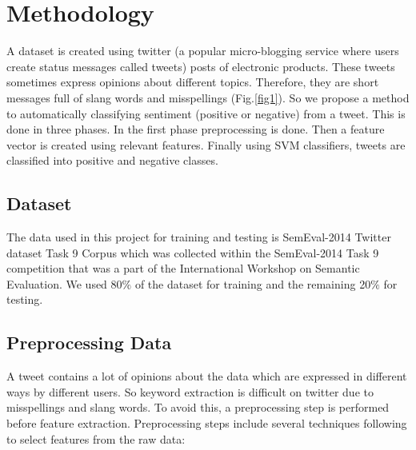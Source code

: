 \section{Methodology}
\label{sec: Methodology}


A dataset is created using twitter (a popular micro-blogging service where users create status messages called tweets) posts of electronic products. These tweets sometimes express opinions about different topics. Therefore, they are short messages full of slang words and misspellings (Fig.\ref{fig1}).  So we propose a method to automatically classifying sentiment (positive or negative) from a tweet. This is done in three phases. In the first phase preprocessing is done. Then a feature vector is created using relevant features. Finally using SVM classifiers, tweets are classified into positive and negative classes. 

\begin{figure*}[!htb]
    \caption{\label{fig1} Original dataset}
\end{figure*}

\begin{figure*}[!htb]
    \caption{\label{fig3} Our dataset after preprocessing}
\end{figure*}


\subsection{Dataset}
\label{sec: Dataset}

The data used in this project for training and testing is SemEval-2014 Twitter dataset Task 9 Corpus \cite{nakov2016evaluation} which was collected within the SemEval-2014 Task 9 competition that was a part of the International Workshop on Semantic Evaluation. We used 80$\%$ of the dataset for training and the remaining 20$\%$ for testing.


\subsection{Preprocessing Data}
\label{sec: Preprocessing Data}

A tweet contains a lot of opinions about the data which are expressed in different ways by different users. So keyword extraction is difficult on twitter due to misspellings and slang words. To avoid this, a preprocessing step is performed before feature extraction. Preprocessing steps include several techniques following to select features from the raw data: 

